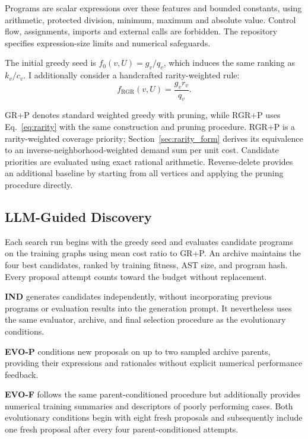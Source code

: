 \begin{samepage}
Programs are scalar expressions over these features and bounded constants,
using arithmetic, protected division, minimum, maximum and absolute value.
Control flow, assignments, imports and external calls are forbidden.
The repository specifies expression-size limits and numerical safeguards.\par
\end{samepage}

The initial greedy seed is
$f_0(v,U)=g_v/q_v$, which induces the same ranking
as $k_v/c_v$. I additionally consider a handcrafted
rarity-weighted rule:
\begin{equation}
f_{\mathrm{RGR}}(v,U)
    =\frac{g_vr_v}{q_v}.
\label{eq:rarity}
\end{equation}

GR+P denotes standard weighted greedy with pruning,
while RGR+P uses Eq.~\eqref{eq:rarity} with the same
construction and pruning procedure. RGR+P is a rarity-weighted coverage
priority; Section~\ref{sec:rarity_form} derives its equivalence to an
inverse-neighborhood-weighted demand sum per unit cost. Candidate
priorities are evaluated using exact rational arithmetic.
Reverse-delete provides an additional baseline by
starting from all vertices and applying the pruning
procedure directly.

\subsection{LLM-Guided Discovery}

Each search run begins with the greedy seed and evaluates candidate
programs on the training graphs using mean cost ratio to GR+P.
An archive maintains the four best candidates, ranked
by training fitness, AST size, and program hash.
Every proposal attempt counts toward the budget without replacement.

\textbf{IND} generates candidates independently,
without incorporating previous programs or evaluation
results into the generation prompt. It nevertheless
uses the same evaluator, archive, and final selection
procedure as the evolutionary conditions.

\textbf{EVO-P} conditions new proposals on up to two
sampled archive parents, providing their expressions
and rationales without explicit numerical performance
feedback.

\textbf{EVO-F} follows the same parent-conditioned
procedure but additionally provides numerical training
summaries and descriptors of poorly performing cases.
Both evolutionary conditions begin with eight fresh
proposals and subsequently include one fresh proposal
after every four parent-conditioned attempts.

